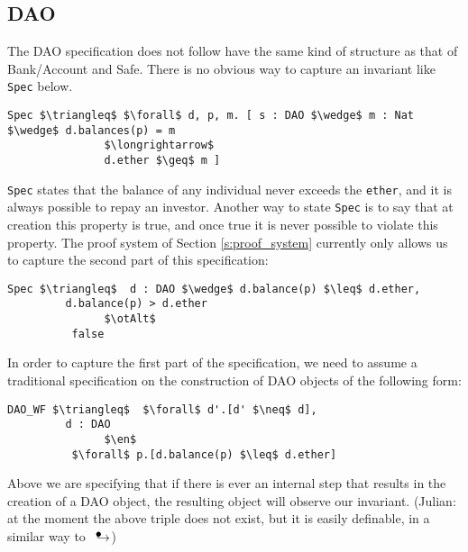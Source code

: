 \documentclass[12pt]{article}
\newcommand\trans{\mathlarger{\mathlarger \leadsto}}
\newcommand\intstep{\hspace{1.5mm}{\raisebox{3pt}{$\bullet$}}\hspace{-1.5mm}{\hookrightarrow}}
\newcommand\en{\hspace{1.5mm}{\raisebox{0pt}{$\bullet$}}\hspace{-4mm}{\hookrightarrow}}
\newcommand\otAlt{\hspace{2mm}{\raisebox{0.5pt}{$\bullet$}}\hspace{-2.75mm}{\trans}}
\numberwithin{case}{lemma}
\numberwithin{case}{theorem}
\numberwithin{subcase}{case}
\begin{document}
\subsection{DAO}
The DAO specification does not follow have the same kind of structure 
as that of Bank/Account and Safe. There is no obvious way to capture 
an invariant like \texttt{Spec} below.
\begin{lstlisting}[mathescape=true]
Spec $\triangleq$ $\forall$ d, p, m. [ s : DAO $\wedge$ m : Nat $\wedge$ d.balances(p) = m
               $\longrightarrow$
               d.ether $\geq$ m ]
\end{lstlisting}
\texttt{Spec} states that the balance of any individual never exceeds the \texttt{ether},
and it is always possible to repay an investor. Another way to state \texttt{Spec} is 
to say that at creation this property is true, and once true it is never possible
to violate this property. The proof system of Section \ref{s:proof_system} currently only 
allows us to capture the second part of this specification:
\begin{lstlisting}[mathescape=true]
Spec $\triangleq$  d : DAO $\wedge$ d.balance(p) $\leq$ d.ether,
         d.balance(p) > d.ether
               $\otAlt$
          false
\end{lstlisting}
In order to capture the first part of the specification, we need to assume a traditional specification 
on the construction of DAO objects of the following form:
\begin{lstlisting}[mathescape=true]
DAO_WF $\triangleq$  $\forall$ d'.[d' $\neq$ d],
         d : DAO
               $\en$
          $\forall$ p.[d.balance(p) $\leq$ d.ether]
\end{lstlisting}
Above we are specifying that if there is ever an internal step that results in the creation of 
a DAO object, the resulting object will observe our invariant.
{\color{red}(Julian: at the moment the above triple does not exist, but it is easily definable, in
a similar way to $\intstep$)}
\end{document}
